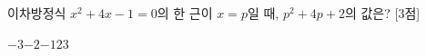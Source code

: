 이차방정식 $x^2+4x-1=0$의 한 근이 $x=p$일 때, $p^2+4p+2$의 값은? \mbox{[3점]}
\begin{choices32}{$-3$}{$-2$}{$-1$}{$2$}{$3$}\end{choices32}

